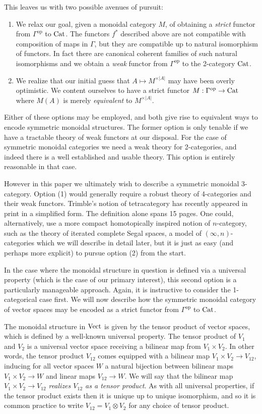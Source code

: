 \documentclass{amsart}
\begin{document}
This leaves us with two possible avenues of pursuit:
\begin{enumerate}
	\item We relax our goal, given a monoidal category $M$, of obtaining a {\em strict} functor from $\Gamma^\text{op}$ to $\mathrm{Cat}$. The functors $f^*$ described above are not compatible with composition of maps in $\Gamma$, but they are compatible up to natural isomorphism of functors. In fact there are canonical coherent families of such natural isomorphisms and we obtain a {\em weak} functor from $\Gamma^\text{op}$ to the 2-category $\mathrm{Cat}$. 
	\item We realize that our initial guess that $A \mapsto M^{\times |A|}$ may have been overly optimistic. We content ourselves to have a strict functor $M: \Gamma^\text{op} \to \mathrm{Cat}$ where $M(A)$ is merely {\em equivalent} to  $M^{\times |A|}$. 
\end{enumerate}
Either of these options may be employed, and both give rise to equivalent ways to encode symmetric monoidal structures. The former option is only tenable if we have a tractable theory of weak functors at our disposal. For the case of symmetric monoidal categories we need a weak theory for 2-categories, and indeed there is a well established and usable theory. This option is entirely reasonable in that case. 

However in this paper we ultimately wish to describe a symmetric monoidal 3-category. Option (1) would generally require a robust theory of 4-categories and their weak functors. Trimble's notion of tetracategory has recently appeared in print \cite{1112.0560} in a simplified form. The definition alone spans 15 pages. One could, alternatively, use a more compact homotopically inspired notion of $n$-category, such as the theory of iterated complete Segal spaces, a model of $(\infty, n)$-categories which we will describe in detail later, but it is just as easy (and perhaps more explicit) to pursue option (2) from the start. 

In the case where the monoidal structure in question is defined via a universal property (which is the case of our primary interest), this second option is a particularly manageable approach. Again, it is instructive to consider the 1-categorical case first. We will now describe how the symmetric monoidal category of vector spaces may be encoded as a strict functor from $\Gamma^\text{op}$ to $\mathrm{Cat}$. 

The monoidal structure in $\mathrm{Vect}$ is given by the tensor product of vector spaces, which is defined by a well-known universal property. The tensor product of $V_1$ and $ V_2$ is a universal vector space receiving a bilinear map from $V_1 \times V_2$. In other words, the tensor product $V_{12}$ comes equipped with a bilinear map  $V_1 \times V_2 \to V_{12}$, inducing for all vector spaces $W$ a natural bijection between bilinear maps $V_1 \times V_2 \to W$ and linear maps $V_{12} \to W$. We will say that the bilinear map  $V_1 \times V_2 \to V_{12}$ {\em realizes $V_{12}$ as a tensor product}. As with all universal properties, if the tensor product exists then it is unique up to unique isomorphism, and so it is common practice to write $V_{12} = V_1 \otimes V_2$ for any choice of tensor product.
\end{document}
